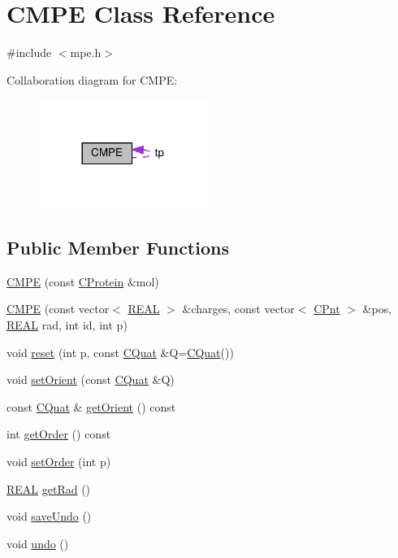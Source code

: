 \hypertarget{classCMPE}{\section{C\-M\-P\-E Class Reference}
\label{classCMPE}
}


{\ttfamily \#include $<$mpe.\-h$>$}



Collaboration diagram for C\-M\-P\-E\-:
\nopagebreak
\begin{figure}[H]
\begin{center}
\leavevmode
\includegraphics[width=156pt]{classCMPE__coll__graph}
\end{center}
\end{figure}
\subsection*{Public Member Functions}
\begin{DoxyCompactItemize}
\item 
\hyperlink{classCMPE_aee8dd608bd75c7d0415da2746f54acee}{C\-M\-P\-E} (const \hyperlink{classCProtein}{C\-Protein} \&mol)
\item 
\hyperlink{classCMPE_adbfa1276efd0ce18d73b6943542d6147}{C\-M\-P\-E} (const vector$<$ \hyperlink{util_8h_a5821460e95a0800cf9f24c38915cbbde}{R\-E\-A\-L} $>$ \&charges, const vector$<$ \hyperlink{classCPnt}{C\-Pnt} $>$ \&pos, \hyperlink{util_8h_a5821460e95a0800cf9f24c38915cbbde}{R\-E\-A\-L} rad, int id, int p)
\item 
void \hyperlink{classCMPE_ae44b4e76215412230e279f34bd5b9fab}{reset} (int p, const \hyperlink{classCQuat}{C\-Quat} \&Q=\hyperlink{classCQuat}{C\-Quat}())
\item 
void \hyperlink{classCMPE_a688ea48a4a13e704fc97e27c0f6dc78a}{set\-Orient} (const \hyperlink{classCQuat}{C\-Quat} \&Q)
\item 
const \hyperlink{classCQuat}{C\-Quat} \& \hyperlink{classCMPE_a30f8be93a38d1e9ead77be6bbdc8488f}{get\-Orient} () const 
\item 
int \hyperlink{classCMPE_a047394488b2ce41894b336b6a1d8e30a}{get\-Order} () const 
\item 
void \hyperlink{classCMPE_a403e7cea8cfca8cb9e76dff5dc396c10}{set\-Order} (int p)
\item 
\hyperlink{util_8h_a5821460e95a0800cf9f24c38915cbbde}{R\-E\-A\-L} \hyperlink{classCMPE_aa34361e7b83d5e63f866773e9c745588}{get\-Rad} ()
\item 
void \hyperlink{classCMPE_ad67fb6e520dbc05e63152b18a6363014}{save\-Undo} ()
\item 
void \hyperlink{classCMPE_a7033cf96c5b5f6301c6021c97a3f6d36}{undo} ()
\end{DoxyCompactItemize}
